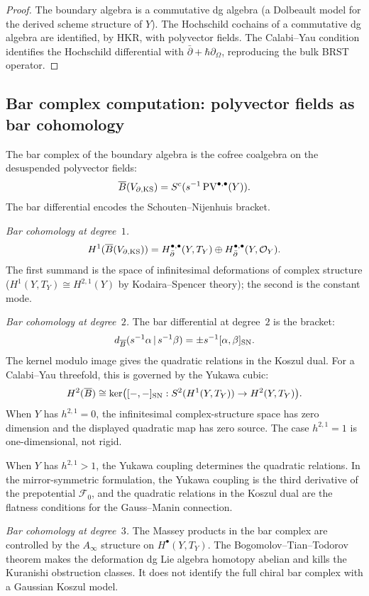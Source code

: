 \begin{proof}
The boundary algebra is a commutative dg algebra (a Dolbeault
model for the derived scheme structure of $Y$). The Hochschild
cochains of a commutative dg algebra are identified, by HKR,
with polyvector fields. The Calabi--Yau condition identifies the
Hochschild differential with $\bar\partial+\hbar\partial_\Omega$,
reproducing the bulk BRST operator.
\end{proof}


\subsection{Bar complex computation: polyvector fields as bar
cohomology}

\begin{computation}
The bar complex of the boundary algebra is the cofree coalgebra
on the desuspended polyvector fields:
\[
\overline{B}(V_{\partial,\mathrm{KS}})
= S^c(s^{-1}\operatorname{PV}^{\bullet,\bullet}(Y)).
\]
The bar differential encodes the Schouten--Nijenhuis bracket.

\emph{Bar cohomology at degree~$1$.}
\[
H^1(\overline{B}(V_{\partial,\mathrm{KS}}))
= H^{\bullet,\bullet}_{\bar\partial}(Y,T_Y)
\oplus H^{\bullet,\bullet}_{\bar\partial}(Y,\mathcal O_Y).
\]
The first summand is the space of infinitesimal deformations
of complex structure ($H^1(Y,T_Y)\cong H^{2,1}(Y)$ by
Kodaira--Spencer theory); the second is the constant mode.

\emph{Bar cohomology at degree~$2$.}
The bar differential at degree~$2$ is the bracket:
\[
d_{\overline{B}}(s^{-1}\alpha\,|\,s^{-1}\beta)
= \pm s^{-1}[\alpha,\beta]_{\mathrm{SN}}.
\]
The kernel modulo image gives the quadratic relations in
the Koszul dual. For a Calabi--Yau threefold, this is
governed by the Yukawa cubic:
\begin{equation}%
H^2(\barB)
\cong \ker\bigl(
[-,-]_{\sn}: S^2(H^1(Y,T_Y))\to H^2(Y,T_Y)
\bigr).
\end{equation}
When $Y$ has $h^{2,1}=0$, the infinitesimal complex-structure
space has zero dimension and the displayed quadratic map has zero
source. The case $h^{2,1}=1$ is one-dimensional, not rigid.

When $Y$ has $h^{2,1}>1$, the Yukawa coupling determines
the quadratic relations. In the mirror-symmetric
formulation, the Yukawa coupling is the third derivative
of the prepotential $\mathcal{F}_0$, and the quadratic
relations in the Koszul dual are the flatness conditions
for the Gauss--Manin connection.

\emph{Bar cohomology at degree~$3$.}
The Massey products in the bar complex are controlled by
the $A_\infty$ structure on $H^\bullet(Y,T_Y)$. The
Bogomolov--Tian--Todorov theorem makes the deformation
dg Lie algebra homotopy abelian and kills the Kuranishi
obstruction classes. It does not identify the full chiral bar
complex with a Gaussian Koszul model.
\end{computation}


